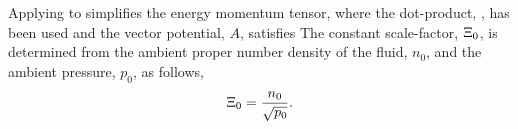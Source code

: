 


Applying  to  simplifies the energy momentum tensor,
where the dot-product, , has been used and the vector potential, $A$,  satisfies
The constant scale-factor, $\Xi_0$, is determined from the ambient proper number density of the fluid, $n_0$, and the ambient pressure, $p_0$, as follows,
\begin{align}
\Xi_0 = \frac{n_0}{\sqrt{p_0}}. 
\label{eqn:scalefactor}
\end{align}

